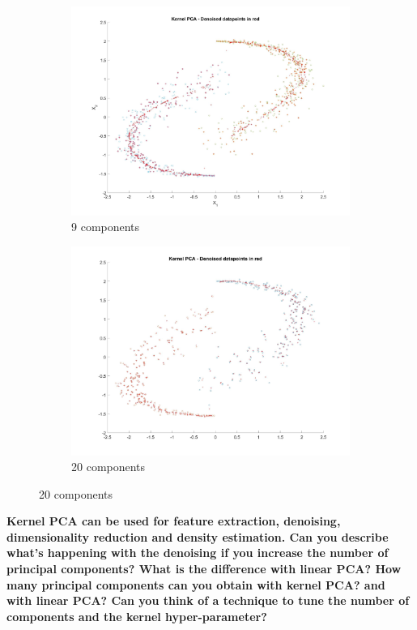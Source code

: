 \documentclass[11pt,oneside,a4paper]{article}
\begin{document}
\begin{figure}[H]
\begin{subfigure}[b]{0.4\textwidth}
		\includegraphics[width=\textwidth]{../Figures/kernel_9}
		\caption{9 components}
	\end{subfigure}
	\begin{subfigure}[b]{0.4\textwidth}
		\includegraphics[width=\textwidth]{../Figures/kernal_20}
		\caption{20 components}
\end{subfigure}		
\end{figure}
\textbf{Kernel PCA can be used for feature extraction, denoising, dimensionality reduction and density estimation. Can you describe what's happening with the denoising if you increase the number of principal components? What is the difference with linear PCA? How many principal components can you obtain with kernel PCA? and
with linear PCA? Can you think of a technique to tune the number of components and the kernel hyper-parameter?}\\
\end{document}
